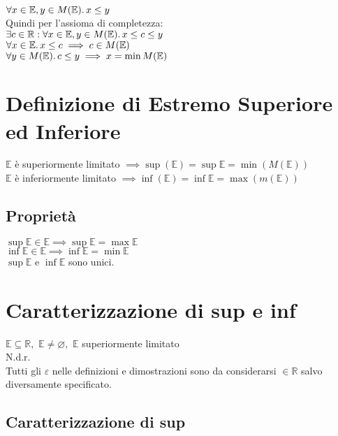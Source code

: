 \documentclass[a4paper, twoside, italian, 11pt]{book}
\newcommand{\R}{\mathbb{R}}
\newcommand{\E}{\mathbb{E}}
\let\emptyset\varnothing
\begin{document}
\noindent
$\forall x \in \E, y \in M(\E) \ldotp x \leq y$ \\

\noindent
Quindi per l'assioma di completezza: \\

\noindent
$\exists c \in \R : \forall x \in \E, y \in M(\E) \ldotp x \leq c \leq y$ \\

\noindent
$\forall x \in \E \ldotp x \leq c \implies c \in M(\E)$ \\
$\forall y \in M(\E) \ldotp c \leq y \implies x = \min M(\E)$



\section{Definizione di Estremo Superiore ed Inferiore}

\noindent
$\E$ è superiormente limitato $\implies \sup(\E) = \sup \E = \min(M(\E))$ \\

\noindent
$\E$ è inferiormente limitato $\implies \inf(\E) = \inf \E = \max(m(\E))$


\subsection{Proprietà}

\noindent
$\sup \E \in \E \implies \sup \E = \max \E$ \\
$\inf \E \in \E \implies \inf \E = \min \E$ \\
$\sup \E$ e $\inf \E$ sono unici.



\section{Caratterizzazione di sup e inf}

\noindent
$\E \subseteq \R,$ $\E \neq \emptyset,$ $\E$ superiormente limitato \\

\noindent
N.d.r. \\
Tutti gli $\varepsilon$ nelle definizioni e dimostrazioni sono da considerarsi $\in \R$ salvo diversamente specificato.


\subsection{Caratterizzazione di sup}
\end{document}
